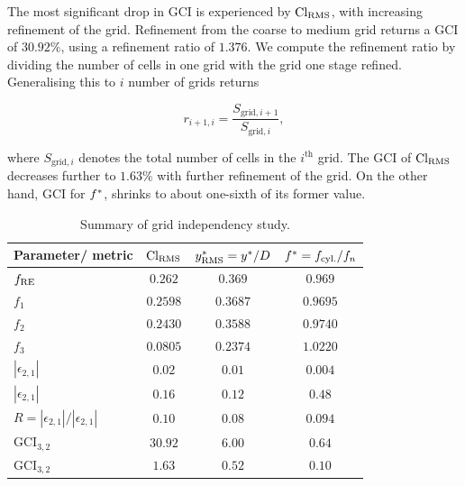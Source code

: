 \documentclass[oneside]{utmthesis}
\begin{document}
The most significant drop in GCI is experienced by $\text{Cl}_{\text{RMS}}$, with increasing refinement of the grid. Refinement from the coarse to medium grid returns a GCI of $30.92\%$, using a refinement ratio of $1.376$. We compute the refinement ratio by dividing the number of cells in one grid with the grid one stage refined. Generalising this to $i$ number of grids returns

\begin{equation}
  r_{i+1,i} = \frac{S_{\text{grid},i+1}}{S_{\text{grid},i}},
  \label{eq:refinementRatio}
\end{equation}

\noindent where $S_{\text{grid},i}$ denotes the total number of cells in the $i^{\text{th}}$ grid. The GCI of $\text{Cl}_{\text{RMS}}$ decreases further to $1.63\%$ with further refinement of the grid. On the other hand, GCI for $f^{*}$, shrinks to about one-sixth of its former value.

\begin{table}[!ht]
\centering
\caption{Summary of grid independency study.} \label{tab:gridIndependency}
\vspace{\baselineskip}
\begin{tabular}{l c c c}
  \hline
  \hline
Parameter/ metric                                                       & $\text{Cl}_{\text{RMS}}$       & $y^{*}_{\text{RMS}} = y^{*}/D$ & $f^{*} = f_{\text{cyl.}} / f_{n}$ \\
  \hline
$f_{\text{RE}}$                                                                  & $0.262$        & $0.369$           & $0.969$               \\
$f_{1}$                                                                 & $0.2598$       & $0.3687$          & $0.9695$              \\
$f_{2}$                                                                 & $0.2430$       & $0.3588$          & $0.9740$              \\
$f_{3}$                                                                 & $0.0805$       & $0.2374$          & $1.0220$              \\
$\left | \epsilon_{2,1} \right |$                                       & $0.02$         & $0.01$            & $0.004$               \\
$\left | \epsilon_{2,1} \right |$                                       & $0.16$         & $0.12$            & $0.48$                \\
$R = \left | \epsilon_{2,1} \right | / \left | \epsilon_{2,1} \right |$ & $0.10$         & $0.08$            & $0.094$               \\
$\text{GCI}_{3,2}$                                                      & $30.92$        & $6.00$            & $0.64$                \\  
$\text{GCI}_{3,2}$                                                      & $1.63$         & $0.52$            & $0.10$                \\
  \hline
  \hline
\end{tabular}
\end{table}
\end{document}
